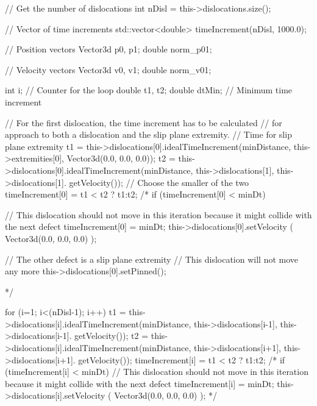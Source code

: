 \begin{DoxyCode}
{
  // Get the number of dislocations
  int nDisl = this->dislocations.size();
  
  // Vector of time increments
  std::vector<double> timeIncrement(nDisl, 1000.0);
   
  // Position vectors
  Vector3d p0, p1;
  double norm_p01;

  // Velocity vectors
  Vector3d v0, v1;
  double norm_v01;

  int i;         // Counter for the loop
  double t1, t2;
  double dtMin;  // Minimum time increment

  // For the first dislocation, the time increment has to be calculated
  // for approach to both a dislocation and the slip plane extremity.
  // Time for slip plane extremity
  t1 = this->dislocations[0].idealTimeIncrement(minDistance,
                                                this->extremities[0],
                                                Vector3d(0.0, 0.0, 0.0));
  t2 = this->dislocations[0].idealTimeIncrement(minDistance,
                                                this->dislocations[1],
                                                this->dislocations[1].
      getVelocity());
  // Choose the smaller of the two
  timeIncrement[0] = t1 < t2 ? t1:t2;
  /*
    if (timeIncrement[0] < minDt)
    {
    // This dislocation should not move in this iteration because it might
       collide with the next defect
    timeIncrement[0] = minDt;
    this->dislocations[0].setVelocity ( Vector3d(0.0, 0.0, 0.0) );

    // The other defect is a slip plane extremity
    // This dislocation will not move any more
    this->dislocations[0].setPinned();
    }
  */

  for (i=1; i<(nDisl-1); i++)
    {
      t1 = this->dislocations[i].idealTimeIncrement(minDistance,
                                                    this->dislocations[i-1],
                                                    this->dislocations[i-1].
      getVelocity());
      t2 = this->dislocations[i].idealTimeIncrement(minDistance,
                                                    this->dislocations[i+1],
                                                    this->dislocations[i+1].
      getVelocity());
      timeIncrement[i] = t1 < t2 ? t1:t2;
      /*
        if (timeIncrement[i] < minDt)
        {
        // This dislocation should not move in this iteration because it might
       collide with the next defect
        timeIncrement[i] = minDt;
        this->dislocations[i].setVelocity ( Vector3d(0.0, 0.0, 0.0) );
        }
      */
    }

}
\end{DoxyCode}

